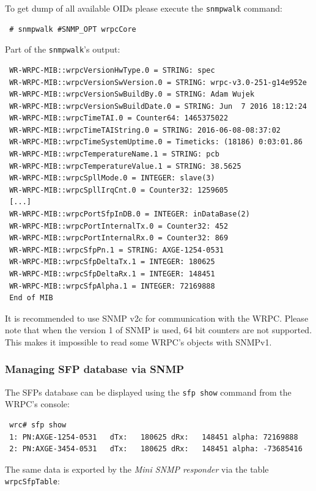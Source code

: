 \documentclass[a4paper, 12pt]{article}
\newcommand{\codeHook}[1]{\mbox{\ttfamily\MakeTextUppercase{#1}}}
\begin{document}
To get dump of all available OIDs please execute the \texttt{snmpwalk} command:
\begin{lstlisting}
 # snmpwalk #SNMP_OPT wrpcCore
\end{lstlisting}
Part of the \texttt{snmpwalk}'s output:
\begin{lstlisting}
 WR-WRPC-MIB::wrpcVersionHwType.0 = STRING: spec
 WR-WRPC-MIB::wrpcVersionSwVersion.0 = STRING: wrpc-v3.0-251-g14e952e
 WR-WRPC-MIB::wrpcVersionSwBuildBy.0 = STRING: Adam Wujek
 WR-WRPC-MIB::wrpcVersionSwBuildDate.0 = STRING: Jun  7 2016 18:12:24
 WR-WRPC-MIB::wrpcTimeTAI.0 = Counter64: 1465375022
 WR-WRPC-MIB::wrpcTimeTAIString.0 = STRING: 2016-06-08-08:37:02
 WR-WRPC-MIB::wrpcTimeSystemUptime.0 = Timeticks: (18186) 0:03:01.86
 WR-WRPC-MIB::wrpcTemperatureName.1 = STRING: pcb
 WR-WRPC-MIB::wrpcTemperatureValue.1 = STRING: 38.5625
 WR-WRPC-MIB::wrpcSpllMode.0 = INTEGER: slave(3)
 WR-WRPC-MIB::wrpcSpllIrqCnt.0 = Counter32: 1259605
 [...]
 WR-WRPC-MIB::wrpcPortSfpInDB.0 = INTEGER: inDataBase(2)
 WR-WRPC-MIB::wrpcPortInternalTx.0 = Counter32: 452
 WR-WRPC-MIB::wrpcPortInternalRx.0 = Counter32: 869
 WR-WRPC-MIB::wrpcSfpPn.1 = STRING: AXGE-1254-0531
 WR-WRPC-MIB::wrpcSfpDeltaTx.1 = INTEGER: 180625
 WR-WRPC-MIB::wrpcSfpDeltaRx.1 = INTEGER: 148451
 WR-WRPC-MIB::wrpcSfpAlpha.1 = INTEGER: 72169888
 End of MIB
\end{lstlisting}

It is recommended to use SNMP v2c for communication with the \codeHook{wrpc}.
Please note that when the version 1 of SNMP is used, 64 bit counters are not
supported. This makes it impossible to read some \codeHook{wrpc}'s objects with
SNMPv1.

\label{Managing SFP database via SNMP}
\subsubsection{Managing SFP database via SNMP}

The SFPs database can be displayed using the \texttt{sfp show} command from
the \codeHook{wrpc}'s console:
\begin{lstlisting}
 wrc# sfp show
 1: PN:AXGE-1254-0531   dTx:   180625 dRx:   148451 alpha: 72169888
 2: PN:AXGE-3454-0531   dTx:   180625 dRx:   148451 alpha: -73685416
\end{lstlisting}

The same data is exported by the \textit{Mini SNMP responder} via the table
\texttt{wrpcSfpTable}:
\end{document}
